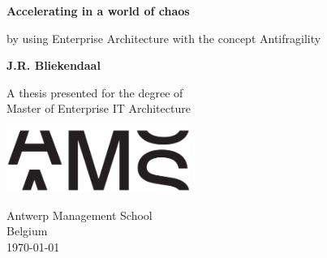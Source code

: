 \begin{titlepage}
	\begin{center}
		\vspace*{1cm}
		
		\Huge
		\textbf{Accelerating in a world of chaos}
		
		\vspace{0.5cm}
		\large
		
		by using Enterprise Architecture with the concept Antifragility
		
		\vspace{1.5cm}
		\Large
		\textbf{J.R. Bliekendaal}
		
		\vfill
		\large
		A thesis presented for the degree of\\
		Master of Enterprise IT Architecture
		
		\vspace{0.8cm}
	
			\includegraphics[width=6cm]{images/ams-logo}
		
		\vspace{0.8cm}
		
		\Large
		Antwerp Management School\\
		Belgium\\
		\today
		
	\end{center}
\end{titlepage}